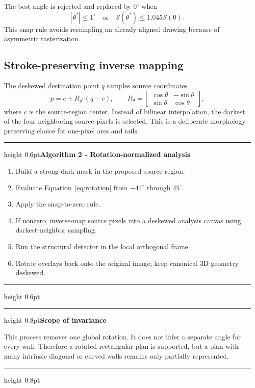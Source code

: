 \documentclass[11pt,a4paper]{article}
\newenvironment{warningbox}[1]{
  \par\medskip\noindent\begin{minipage}{\textwidth}
  \color{Orange}\hrule height 0.8pt\vspace{1.6mm}\textbf{#1}\par\smallskip\color{Ink}
}{
  \vspace{1.3mm}\color{Orange}\hrule height 0.8pt\end{minipage}\par\medskip
}
\newenvironment{algorithmblock}[1]{
  \par\medskip\noindent\begin{minipage}{\textwidth}
  \color{Ink!55}\hrule height 0.6pt\vspace{1.4mm}\textbf{#1}\par\smallskip\color{Ink}
}{
  \vspace{1.2mm}\color{Ink!55}\hrule height 0.6pt\end{minipage}\par\medskip
}
\begin{document}
The best angle is rejected and replaced by $0^\circ$ when
\begin{equation}
|\theta^*|\leq1^\circ\quad\text{or}\quad S(\theta^*)\leq1.045S(0).
\end{equation}
This snap rule avoids resampling an already aligned drawing because of asymmetric rasterization.

\subsection{Stroke-preserving inverse mapping}

The deskewed destination point $q$ samples source coordinates
\begin{equation}
p=c+R_{\theta^*}(q-c),\qquad
R_\theta=\begin{bmatrix}\cos\theta&-\sin\theta\\\sin\theta&\cos\theta\end{bmatrix},
\end{equation}
where $c$ is the source-region center. Instead of bilinear interpolation, the darkest of the four neighboring source pixels is selected. This is a deliberate morphology-preserving choice for one-pixel arcs and rails.

\begin{algorithmblock}{Algorithm 2 - Rotation-normalized analysis}
\begin{enumerate}
  \item Build a strong dark mask in the proposed source region.
  \item Evaluate Equation~\eqref{eq:rotation} from $-44^\circ$ through $45^\circ$.
  \item Apply the snap-to-zero rule.
  \item If nonzero, inverse-map source pixels into a deskewed analysis canvas using darkest-neighbor sampling.
  \item Run the structural detector in the local orthogonal frame.
  \item Rotate overlays back onto the original image; keep canonical 3D geometry deskewed.
\end{enumerate}
\end{algorithmblock}

\begin{warningbox}{Scope of invariance}
This process removes one global rotation. It does not infer a separate angle for every wall. Therefore a rotated rectangular plan is supported, but a plan with many intrinsic diagonal or curved walls remains only partially represented.
\end{warningbox}
\end{document}
